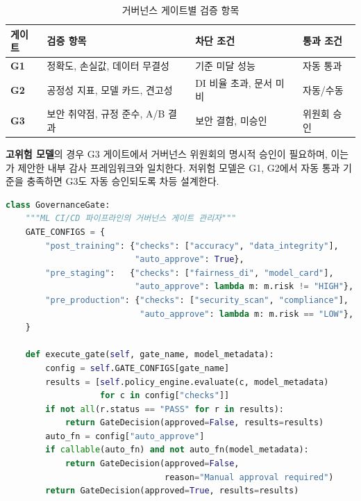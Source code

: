 \begin{table}[htbp]
\centering
\caption{거버넌스 게이트별 검증 항목}
\label{tab:14_gate_checks}
\begin{tabularx}{\textwidth}{lXXl}
\toprule
\textbf{게이트} & \textbf{검증 항목} & \textbf{차단 조건} & \textbf{통과 조건} \\
\midrule
\textbf{G1} & 정확도, 손실값, 데이터 무결성 & 기준 미달 성능 & 자동 통과 \\
\textbf{G2} & 공정성 지표, 모델 카드, 견고성 & DI 비율 초과, 문서 미비 & 자동/수동 \\
\textbf{G3} & 보안 취약점, 규정 준수, A/B 결과 & 보안 결함, 미승인 & 위원회 승인 \\
\bottomrule
\end{tabularx}
\end{table}

\textbf{고위험 모델}의 경우 G3 게이트에서 거버넌스 위원회의 명시적 승인이 필요하며, 이는 \cite{raji2020closing}가 제안한 내부 감사 프레임워크와 일치한다. 저위험 모델은 G1, G2에서 자동 통과 기준을 충족하면 G3도 자동 승인되도록 차등 설계한다.

\begin{lstlisting}[language=Python, caption={CI/CD 거버넌스 게이트 구현}, label={lst:cicd_gate}]
class GovernanceGate:
    """ML CI/CD 파이프라인의 거버넌스 게이트 관리자"""
    GATE_CONFIGS = {
        "post_training": {"checks": ["accuracy", "data_integrity"],
                          "auto_approve": True},
        "pre_staging":   {"checks": ["fairness_di", "model_card"],
                          "auto_approve": lambda m: m.risk != "HIGH"},
        "pre_production": {"checks": ["security_scan", "compliance"],
                           "auto_approve": lambda m: m.risk == "LOW"},
    }

    def execute_gate(self, gate_name, model_metadata):
        config = self.GATE_CONFIGS[gate_name]
        results = [self.policy_engine.evaluate(c, model_metadata)
                   for c in config["checks"]]
        if not all(r.status == "PASS" for r in results):
            return GateDecision(approved=False, results=results)
        auto_fn = config["auto_approve"]
        if callable(auto_fn) and not auto_fn(model_metadata):
            return GateDecision(approved=False,
                                reason="Manual approval required")
        return GateDecision(approved=True, results=results)
\end{lstlisting}

